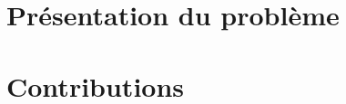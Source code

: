 \documentclass[11pt, a4paper, oldfontcommands]{memoir}
\begin{document}


\renewcommand{\labelitemi}{$\bullet$}
\renewcommand{\labelitemii}{$\bullet$}
\renewcommand{\labelitemiii}{$\bullet$}
\renewcommand{\labelitemiv}{$\bullet$}

\renewcommand{\theequation}{\arabic{section}.\Roman{equation}}

\cleardoublepage

\frontmatter


\cleardoublepage
\cleardoublepage



\tableofcontents

\cleardoublepage



\mainmatter

\cleardoublepage

\part{Présentation du problème}



\cleardoublepage
\cleardoublepage

\part{Contributions}

\cleardoublepage
\cleardoublepage
\cleardoublepage

\cleardoublepage

\backmatter
%

\cleardoublepage



\end{document}
